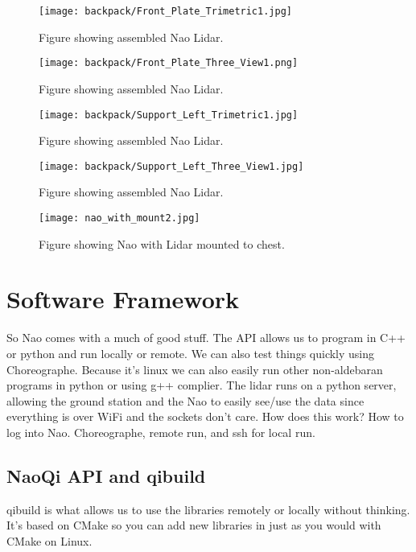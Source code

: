 \begin{figure}
  \centering
  \texttt{[image: backpack/Front\_Plate\_Trimetric1.jpg]}
  \caption{Figure showing assembled Nao Lidar.}
  \label{fig:nao_lidar_mount_frontplate_trimetric1}
\end{figure}

\begin{figure}
  \centering
  \texttt{[image: backpack/Front\_Plate\_Three\_View1.png]}
  \caption{Figure showing assembled Nao Lidar.}
  \label{fig:nao_lidar_mount_frontplate_three_view1}
\end{figure}

\begin{figure}
  \centering
  \texttt{[image: backpack/Support\_Left\_Trimetric1.jpg]}
  \caption{Figure showing assembled Nao Lidar.}
  \label{fig:nao_lidar_mount_supportleft_trimetric1}
\end{figure}

\begin{figure}
  \centering
  \texttt{[image: backpack/Support\_Left\_Three\_View1.jpg]}
  \caption{Figure showing assembled Nao Lidar.}
  \label{fig:nao_lidar_mount_supportleft_three_view1}
\end{figure}

\begin{figure}
  \centering
  \texttt{[image: nao\_with\_mount2.jpg]}
  \caption{Figure showing Nao with Lidar mounted to chest.}
  \label{fig:nao_lidar_mount1}
\end{figure}

\section{Software Framework}
So Nao comes with a much of good stuff. The API allows us to program in C++ or python and run locally or
remote. We can also test things quickly using Choreographe. Because it's linux we can also easily
run other non-aldebaran programs in python or using g++ complier.
The lidar runs on a python server, allowing the ground station and the Nao to easily see/use the data since
everything is over WiFi and the sockets don't care. How does this work?
How to log into Nao. Choreographe, remote run, and ssh for local run.

\subsection{NaoQi API and qibuild}
qibuild is what allows us to use the libraries remotely or locally without thinking. It's based on CMake
so you can add new libraries in just as you would with CMake on Linux.

